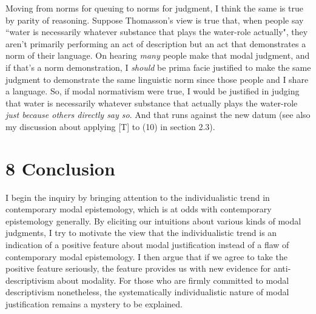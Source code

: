 \documentclass[a4paper,12pt]{article}
\begin{document}
Moving from norms for queuing to norms for judgment, I think the same is true by parity of reasoning. Suppose Thomasson's view is true that, when people say ``water is necessarily whatever substance that plays the water-role actually", they aren't primarily performing an act of description but an act that demonstrates a norm of their language. On hearing \emph{many} people make that modal judgment, and if that's a norm demonstration, I \emph{should} be prima facie justified to make the same judgment to demonstrate the same linguistic norm since those people and I share a language. So, if modal normativism were true, I would be justified in judging that water is necessarily whatever substance that actually plays the water-role \emph{just because others directly say so}. And that runs against the new datum (see also my discussion about applying [T] to (10) in section 2.3).

\section*{8 Conclusion}

I begin the inquiry by bringing attention to the individualistic trend in contemporary modal epistemology, which is at odds with contemporary epistemology generally. By eliciting our intuitions about various kinds of modal judgments, I try to motivate the view that the individualistic trend is an indication of a positive feature about modal justification instead of a flaw of contemporary modal epistemology. I then argue that if we agree to take the positive feature seriously, the feature provides us with new evidence for anti-descriptivism about modality. For those who are firmly committed to modal descriptivism nonetheless, the systematically individualistic nature of modal justification remains a mystery to be explained.

\nocite{*}


\end{document}
